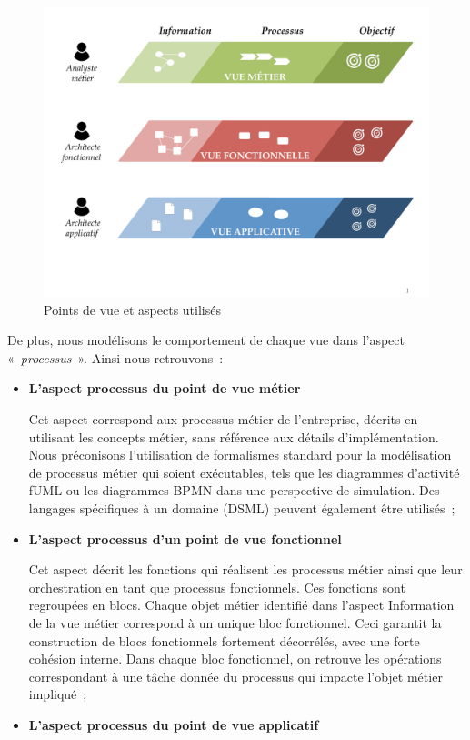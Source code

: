 {\begin{figure}[!ht]
 \begin{center}
  \includegraphics[trim= 0cm 3cm 0cm 0cm, 
width=1\textwidth]{figures/4_demarche/vue_aspect.pdf}
 \end{center}
 \caption{Points de vue et aspects utilisés}
 \label{fig:vue_aspect}
\end{figure}
	
De plus, nous modélisons le comportement de chaque vue dans l'aspect 
«~\textit{processus}~». Ainsi nous retrouvons~:

	\begin{itemize}
	\item \textbf{L'aspect processus du point de vue métier} 
	
	Cet aspect correspond aux processus métier de l'entreprise, décrits en 
utilisant les concepts métier, sans référence aux détails d'implémentation. Nous 
préconisons l'utilisation de formalismes standard pour la modélisation de 
processus métier qui soient exécutables, tels que les diagrammes d'activité fUML 
ou les diagrammes BPMN dans une perspective de simulation. Des langages 
spécifiques à un domaine (DSML) peuvent également être utilisés~;
	\item \textbf{L'aspect processus d'un point de vue fonctionnel} 
	
	Cet aspect décrit les fonctions qui réalisent les processus métier ainsi que 
leur orchestration en tant que processus fonctionnels. Ces fonctions sont 
regroupées en blocs. Chaque objet métier identifié dans l'aspect Information de 
la vue métier correspond à un unique bloc fonctionnel. Ceci garantit la 
construction de blocs fonctionnels fortement décorrélés, avec une forte cohésion 
interne. Dans chaque bloc fonctionnel, on retrouve les opérations correspondant 
à une tâche donnée du processus qui impacte l'objet métier impliqué~;
	\item \textbf{L'aspect processus du point de vue applicatif}
	

\end{itemize}}
